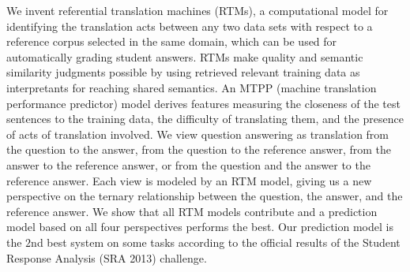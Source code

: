 We invent referential translation machines (RTMs), a computational model for identifying the translation acts between any two data sets with respect to a
 reference corpus selected in the same domain, which can be used for
 automatically grading student answers. 
 RTMs make quality and semantic similarity judgments possible by using retrieved
 relevant training data as interpretants for reaching shared semantics.
 An MTPP (machine translation performance predictor) model derives
 features measuring the closeness of the test sentences to the
 training data, the difficulty of translating them, 
 and the presence of acts of translation involved.
 We view question answering as translation from the question to the answer, from
 the question to the reference answer, from the answer to the reference answer,
 or from the question and
 the answer to the reference answer. 
 Each view is modeled by an RTM model, giving us a new
 perspective on the ternary relationship between the question, the answer, and
 the reference answer.
 We show that all RTM models contribute and a prediction model based on all
 four perspectives performs the best.
 Our prediction model is the $2$nd best system on some tasks according to the
 official results of the Student Response Analysis (SRA 2013) challenge.

